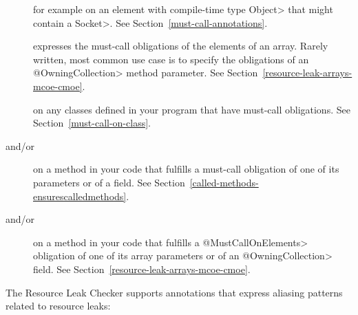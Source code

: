 \begin{description}

\item[]
for example on an element with compile-time type \<Object> that might contain a \<Socket>.
See Section~\ref{must-call-annotations}.

\item[]
expresses the must-call obligations of the elements of an array. Rarely written, most common use case is to specify the obligations of an \<@OwningCollection> method parameter. See Section~\ref{resource-leak-arrays-mcoe-cmoe}.

\item[]
on any classes defined in your program that have must-call obligations. See Section~\ref{must-call-on-class}.

\item[ and/or
      ]
on a method in your code that fulfills a must-call obligation of one of its parameters or of a field.
See Section~\ref{called-methods-ensurescalledmethods}.

\item[ and/or
      ]
on a method in your code that fulfills a \<@MustCallOnElements> obligation of one of its array parameters or of an \<@OwningCollection> field. See Section~\ref{resource-leak-arrays-mcoe-cmoe}.

\end{description}

The Resource Leak Checker supports annotations that express
aliasing patterns related to resource leaks:

